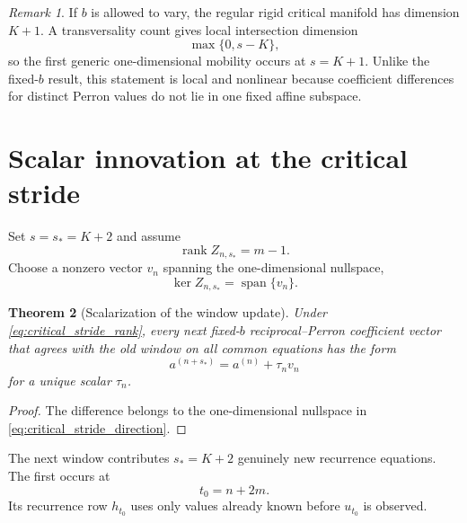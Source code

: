 \documentclass[11pt]{amsart}
\numberwithin{equation}{section}
\theoremstyle{plain}
\newtheorem{theorem}{Theorem}[section]
\theoremstyle{definition}
\theoremstyle{remark}
\newtheorem{remark}[theorem]{Remark}
\begin{document}
\begin{remark}
\label{rem:moving_b_threshold}
If $b$ is allowed to vary, the regular rigid critical manifold has dimension $K+1$.  A transversality count gives local intersection dimension
\begin{equation}
\max\{0,s-K\},
\label{eq:moving_b_local_dimension}
\end{equation}
so the first generic one-dimensional mobility occurs at $s=K+1$.  Unlike the fixed-$b$ result, this statement is local and nonlinear because coefficient differences for distinct Perron values do not lie in one fixed affine subspace.
\end{remark}

\section{Scalar innovation at the critical stride}
\label{sec:scalar_innovation}

Set $s=s_*=K+2$ and assume
\begin{equation}
\operatorname{rank}Z_{n,s_*}=m-1.
\label{eq:critical_stride_rank}
\end{equation}
Choose a nonzero vector $v_n$ spanning the one-dimensional nullspace,
\begin{equation}
\ker Z_{n,s_*}=\operatorname{span}\{v_n\}.
\label{eq:critical_stride_direction}
\end{equation}

\begin{theorem}[Scalarization of the window update]
\label{thm:scalarization}
Under \eqref{eq:critical_stride_rank}, every next fixed-$b$ reciprocal--Perron coefficient vector that agrees with the old window on all common equations has the form
\begin{equation}
a^{(n+s_*)}=a^{(n)}+\tau_n v_n
\label{eq:scalar_coefficient_update}
\end{equation}
for a unique scalar $\tau_n$.
\end{theorem}

\begin{proof}
The difference belongs to the one-dimensional nullspace in \eqref{eq:critical_stride_direction}.
\end{proof}

The next window contributes $s_*=K+2$ genuinely new recurrence equations.  The first occurs at
\begin{equation}
t_0=n+2m.
\label{eq:first_new_time}
\end{equation}
Its recurrence row $h_{t_0}$ uses only values already known before $u_{t_0}$ is observed.
\end{document}
